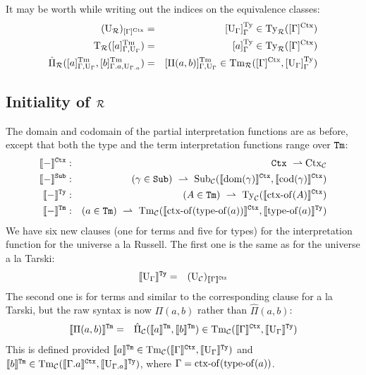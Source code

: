 \documentclass{lmcs}
\def\UU{\mathrm{U}}
\def\Ta{\mathrm{T}}
\def\Pihat{\hat{\Pi}}
\newcommand{\intCtxU}[1]{\llbracket #1 \rrbracket^\RawCtx}
\newcommand{\intSubU}[1]{\llbracket #1 \rrbracket^\RawSub}
\newcommand{\intTyU}[1]{\llbracket #1 \rrbracket^\RawTy}
\newcommand{\intTmU}[1]{\llbracket #1 \rrbracket^\RawTm}
\begin{document}
It may be worth while writing out the indices on the equivalence classes:
\begin{eqnarray*}
(\UU_\R)_{[\Gamma]^\Ctx} &= &[ \UU_\Gamma ]_\Gamma^\Ty \in \Ty_\R([\Gamma]^\Ctx)\\
\Ta_\R([a]_{\Gamma,\UU_\Gamma}^\Tm) &=& [a]_\Gamma^\Ty \in \Ty_\R([\Gamma]^\Ctx)\\
\Pihat_\R([a]_{\Gamma,\UU_\Gamma}^\Tm,[b]_{\Gamma.a,\UU_{\Gamma.a}}^\Tm) &=& [ \Pi(a,b) ]_{\Gamma,\UU_\Gamma}^\Tm  \in \Tm_\R([\Gamma]^\Ctx,[\UU_\Gamma]_\Gamma^\Ty)
\end{eqnarray*}

\subsection{Initiality of $\mathcal{R}$}
The domain and codomain of the partial interpretation functions are as before, except that
both the type and the term interpretation functions range over ${\tt Tm}$:
\begin{eqnarray*}
\intCtxU{-} &:& \RawCtx\ \rightharpoonup \Ctx_\C\\
\intSubU{-}&:& (\gamma \in \RawSub)\ \rightharpoonup \
\Sub_\C(\intCtxU{\domain(\gamma)}, \intCtxU{\codomain(\gamma)})\\
\intTyU{-}&:& (A \in \RawTm)\ \rightharpoonup\ \Ty_\C(\intCtxU{\ctxof(A)})\\
\intTmU{-}&:& (a \in\RawTm)\ \rightharpoonup\
\Tm_\C (\intCtxU{\ctxof(\typeof(a))}, \intTyU{\typeof(a)})
\end{eqnarray*}
We have six new clauses (one for terms and five for types) for the interpretation function for the universe a la Russell. The first one is the same as for the universe a la Tarski:
\begin{eqnarray*}
\intTyU{\UU_\Gamma} &=& (\UU_\C)_{\intCtxU{\Gamma}}
\end{eqnarray*}
The second one is for terms and similar to the corresponding clause for a la Tarski, but the raw syntax is now $\Pi(a,b)$ rather than $\hat{\Pi}(a,b)$:
\begin{eqnarray}
\intTmU{\Pi(a,b)}&=& \hat{\Pi}_\C(\intTmU{a},\intTmU{b}) \in \Tm_\C (\intCtxU{\Gamma}, \intTyU{\UU_\Gamma})
\end{eqnarray}
This is defined provided $\intTmU{a} \in \Tm_\C (\intCtxU{\Gamma}, \intTyU{\UU_\Gamma})$ and  $\intTmU{b} \in \Tm_\C (\intCtxU{\Gamma.a}, \intTyU{\UU_{\Gamma.a}})$, where $\Gamma = \operatorname{ctx-of}(\operatorname{type-of}(a))$. %
\end{document}
